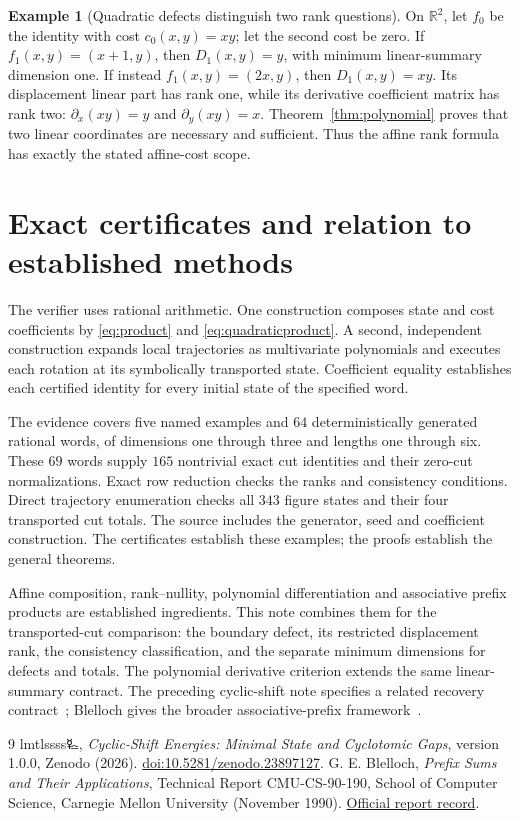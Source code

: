 \documentclass[11pt,a4paper]{article}
\theoremstyle{definition}\newtheorem{definition}[theorem]{Definition}\newtheorem{example}[theorem]{Example}\newtheorem{remark}[theorem]{Remark}
\newcommand{\R}{\mathbb R}\newcommand{\Q}{\mathbb Q}\newcommand{\Z}{\mathbb Z}\newcommand{\N}{\mathbb N}\newcommand{\id}{\mathrm{id}}
\begin{document}
\begin{example}[Quadratic defects distinguish two rank questions]\label{ex:quadratic}
On $\R^2$, let $f_0$ be the identity with cost $c_0(x,y)=xy$;
let the second cost be zero. If $f_1(x,y)=(x+1,y)$, then
$D_1(x,y)=y$, with minimum linear-summary dimension one.
If instead $f_1(x,y)=(2x,y)$, then $D_1(x,y)=xy$.
Its displacement linear part has rank one, while its derivative
coefficient matrix has rank two: $\partial_x(xy)=y$ and
$\partial_y(xy)=x$. Theorem~\ref{thm:polynomial} proves that two
linear coordinates are necessary and sufficient. Thus the affine
rank formula has exactly the stated affine-cost scope.
\end{example}

\section{Exact certificates and relation to established methods}
The verifier uses rational arithmetic. One construction composes state
and cost coefficients by \eqref{eq:product} and
\eqref{eq:quadraticproduct}. A second, independent construction expands
local trajectories as multivariate polynomials and executes each
rotation at its symbolically transported state. Coefficient equality
establishes each certified identity for every initial state of the
specified word.

The evidence covers five named examples and $64$ deterministically
generated rational words, of dimensions one through three and lengths
one through six. These $69$ words supply $165$ nontrivial exact cut
identities and their zero-cut normalizations. Exact row reduction
checks the ranks and consistency conditions. Direct trajectory
enumeration checks all $343$ figure states and their four transported
cut totals. The source includes the generator, seed and coefficient
construction. The certificates establish these examples; the proofs
establish the general theorems.

Affine composition, rank--nullity, polynomial differentiation and
associative prefix products are established ingredients. This note
combines them for the transported-cut comparison: the boundary defect,
its restricted displacement rank, the consistency classification,
and the separate minimum dimensions for defects and totals. The
polynomial derivative criterion extends the same linear-summary
contract. The preceding cyclic-shift note specifies a related recovery
contract~\cite{cyclic}; Blelloch gives the broader associative-prefix
framework~\cite{blelloch}.

\begin{thebibliography}{9}
 lmtlssss{\authorsymbol 🜐},
\emph{Cyclic-Shift Energies: Minimal State and Cyclotomic Gaps},
version 1.0.0, Zenodo (2026).
\href{https://doi.org/10.5281/zenodo.23897127}{doi:10.5281/zenodo.23897127}.
 G. E. Blelloch,
\emph{Prefix Sums and Their Applications}, Technical Report
CMU-CS-90-190, School of Computer Science, Carnegie Mellon University
(November 1990).
\href{https://www.cs.cmu.edu/afs/cs.cmu.edu/project/scandal/public/papers/CMU-CS-90-190.html}{Official report record}.
\end{thebibliography}
\end{document}
